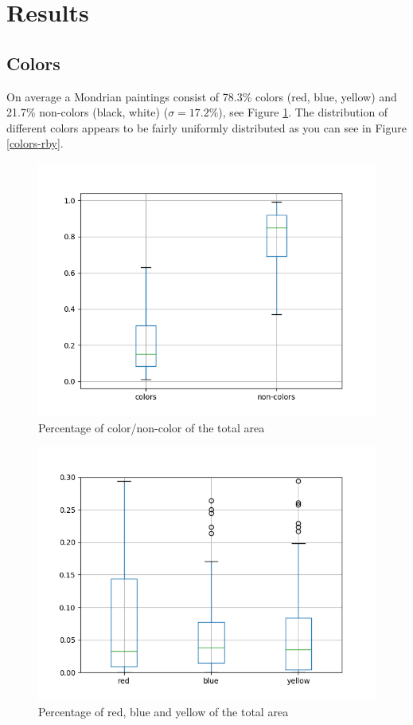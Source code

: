 \section{Results} \label{results}


\subsection{Colors}

On average a Mondrian paintings consist of 78.3\% colors (red, blue, yellow) and
21.7\% non-colors (black, white) ($\sigma = 17.2\%$), see Figure
\ref{fig:colors-noncolors}. The distribution of different colors appears to be
fairly uniformly distributed as you can see in Figure \ref{colors-rby}.

\begin{figure}
  \includegraphics[width=\linewidth]{images/colors-non-colors.png}
  \caption{Percentage of color/non-color of the total area}
  \label{fig:colors-noncolors}
\end{figure}

\begin{figure}
  \includegraphics[width=\linewidth]{images/colors-rby.png}
  \caption{Percentage of red, blue and yellow of the total area}
  \label{fig:colors-rby}
\end{figure}

